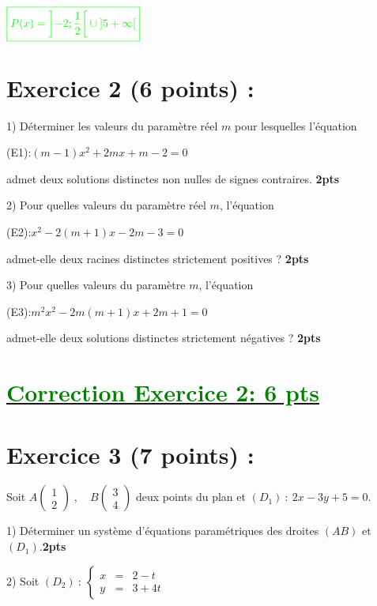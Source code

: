 \documentclass[12pt]{article}
\begin{document}
\begin{itemize}
\begin{itemize}
$\textcolor{green}{\boxed{P(x)=\left] -2; \frac{1}{2}\right[\cup\left]5 +\infty\right[  }}$

\end{itemize}
\end{itemize}

\section*{Exercice 2 (6 points) :}
1) Déterminer les valeurs du paramètre réel \( m \) pour lesquelles l'équation 

(E1):\( (m - 1)x^2 + 2mx + m - 2 = 0 \) 

admet deux solutions distinctes non nulles de signes contraires. \textbf{2pts}

2) Pour quelles valeurs du paramètre réel \( m \), l'équation

(E2):\( x^2 - 2(m + 1)x - 2m - 3 = 0 \) 
 
admet-elle deux racines distinctes strictement positives ? \textbf{2pts}

3) Pour quelles valeurs du paramètre \( m \), l'équation
 
(E3):\( m^{2}x^2 - 2m(m + 1)x + 2m + 1 = 0 \) 

admet-elle deux solutions distinctes strictement négatives ? \textbf{2pts}
\section*{\underline{\textcolor{green}{Correction Exercice 2: \textbf{6 pts}}}}
\section*{Exercice 3 (7 points) :}
Soit $A\begin{pmatrix} 1 \\ 2\end{pmatrix}\;,\quad B\begin{pmatrix} 3 \\ 4\end{pmatrix}$ deux points du plan et $(D_{1})\ :\ 2x-3y+5=0.$

1) Déterminer un système d'équations paramétriques des droites $(AB)$ et $(D_{1}).$\textbf{2pts}

2) Soit $(D_{2})\ :\ \left\lbrace\begin{array}{rcl} x&=&2-t \\ y&=&3+4t\end{array}\right.$
\end{document}
